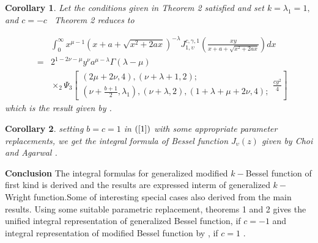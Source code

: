 \documentclass{amsart}
\theoremstyle{plain}
\newtheorem{corollary}{Corollary}
\numberwithin{equation}{section}
\begin{document}
\begin{corollary}
Let the conditions given in Theorem 2 satisfied and set $k=\lambda _{1}=1,$and $c=-c$ \ Theorem 2 reduces to

\begin{eqnarray*}
&&\int_{0}^{\infty }x^{\mu -1}\left( x+a+\sqrt{x^{2}+2ax}\right) ^{-\lambda
}J_{1,\upsilon }^{c,\gamma ,1}\left( \frac{xy}{x+a+\sqrt{x^{2}+2ax}}\right)
dx \\
&=&2^{1-2\nu -\mu }y^{\nu }a^{\mu -\lambda }\Gamma \left( \lambda -\mu
\right)  \\
&&\times _{2}\Psi _{3}\left[ 
\begin{array}{c}
\left( 2\mu +2\nu ,4\right) ,\left( \nu +\lambda +1,2\right) ; \\ 
\left( \nu +\frac{b+1}{2},\lambda _{1}\right) ,\left( \nu +\lambda ,2\right)
,\left( 1+\lambda +\mu +2\nu ,4\right) ;\end{array}\frac{cy^{2}}{4}\right] 
\end{eqnarray*}which is the result given by \cite{Choi-Mathur} .
\end{corollary}

\begin{corollary}
setting $b=c=1$ in $\left( \ref{1}\right) $ with some appropriate parameter
replacements, we get the integral formula of Bessel function $J_{\upsilon
}\left( z\right) $ given by Choi and Agarwal \cite{Choi2}.
\end{corollary}

\textbf{Conclusion}\newline
The integral formulas for generalized modified $k-$Bessel function of first
kind is derived and the results are expressed interm of generalized $k-$Wright function.Some of interesting special cases also derived from the main
results. Using some suitable parametric replacement, theorems 1 and 2 gives
the unified integral representation of generalized Bessel function, if $c=-1$
and integral representation of modified Bessel function by , if $c=1$ .
\end{document}
